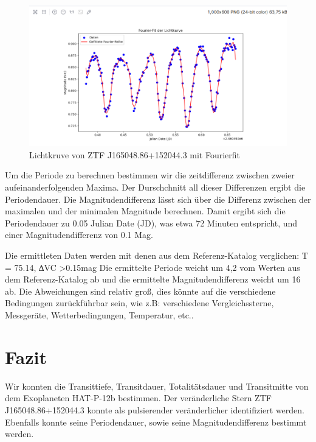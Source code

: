 \documentclass[ngerman,ruledheaders=section,class=report,thesis={type=Protokoll},accentcolor=1b,marginpar=false,parskip=half-,fontsize=11pt,]{tudapub}
\begin{document}
	\begin{figure}[h]
		\centering
		\includegraphics[width=0.8\linewidth]{LK_Fit}
		\caption{Lichtkruve von ZTF J165048.86+152044.3 mit Fourierfit}
		\label{Abbildung 4.44}
	\end{figure}

Um die Periode zu berechnen bestimmen wir die zeitdifferenz zwischen zweier aufeinanderfolgenden Maxima. Der Durschchnitt all dieser Differenzen ergibt die Periodendauer.
Die Magnitudendifferenz lässt sich über die Differenz zwischen der maximalen und der minimalen Magnitude berechnen.
Damit ergibt sich die Periodendauer zu 0.05 Julian Date (JD), was etwa 72 Minuten entspricht, und einer Magnitudendifferenz von 0.1 Mag.

Die ermittleten Daten werden mit denen aus dem Referenz-Katalog verglichen: T = 75.14, ∆VC >0.15mag
Die ermittelte Periode weicht um 4,2 vom Werten aus dem Referenz-Katalog ab und die ermittelte
Magnitudendifferenz weicht um 16 ab. Die Abweichungen sind relativ groß, dies könnte auf die verschiedene Bedingungen zurückführbar sein, wie z.B: verschiedene Vergleichssterne, Messgeräte, Wetterbedingungen, Temperatur, etc..


	\chapter{Fazit}
	Wir konnten die Transittiefe, Transitdauer, Totalitätsdauer und Transitmitte von dem Exoplaneten HAT-P-12b bestimmen.
Der veränderliche Stern ZTF J165048.86+152044.3 konnte als pulsierender veränderlicher identifiziert werden. Ebenfalls konnte seine Periodendauer, sowie seine Magnitudendifferenz bestimmt werden.

	
	
	\printbibliography
	
	
\end{document}
